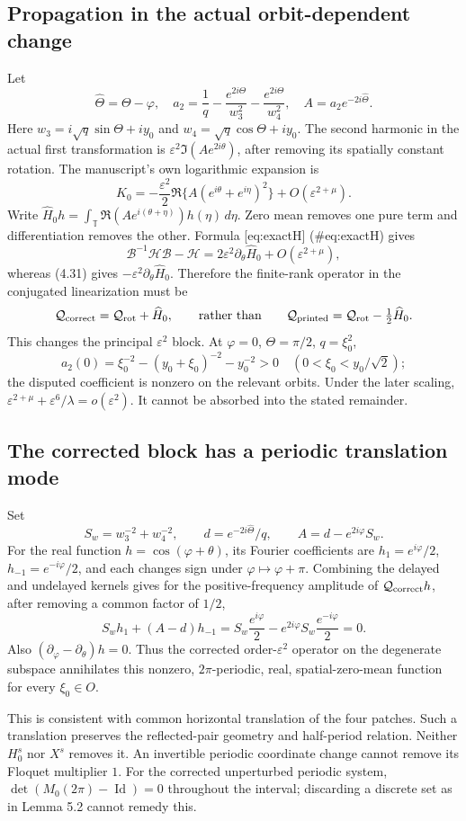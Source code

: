 \documentclass[10pt]{article}
\begin{document}
\subsection*{Propagation in the actual orbit-dependent change}
Let \[\widehat\Theta=\Theta-\varphi,\quad
 a_2=\frac1q-\frac{e^{2i\Theta}}{w_3^2}
                  -\frac{e^{2i\Theta}}{w_4^2},\quad
 A=a_2e^{-2i\widehat\Theta}.\] Here \(w_3=i\sqrt q\sin\Theta+iy_0\) and \(w_4=\sqrt q\cos\Theta+iy_0\). The second harmonic in the actual first transformation is \(\varepsilon^2\Im(Ae^{2i\theta})\), after removing its spatially constant rotation. The manuscript’s own logarithmic expansion is \[K_0=-\frac{\varepsilon^2}{2}
        \Re\{A(e^{i\theta}+e^{i\eta})^2\}
          +O(\varepsilon^{2+\mu}).\] Write \(\widehat H_0h=\int_\mathbb T\Re(Ae^{i(\theta+\eta)})h(\eta)\,d\eta\). Zero mean removes one pure term and differentiation removes the other. Formula [eq:exactH] (\#eq:exactH) gives \[\mathcal B^{-1}\mathcal H\mathcal B-\mathcal H
       =2\varepsilon^2\partial_\theta\widehat H_0
            +O(\varepsilon^{2+\mu}),\] whereas (4.31) gives \(-\varepsilon^2\partial_\theta\widehat H_0\). Therefore the finite-rank operator in the conjugated linearization must be \[\mathcal Q_{\rm correct}=\mathcal Q_{\rm rot}+\widehat H_0,
 \qquad\hbox{rather than}\qquad
 \mathcal Q_{\rm printed}=\mathcal Q_{\rm rot}-\tfrac12\widehat H_0.\] This changes the principal \(\varepsilon^2\) block. At \(\varphi=0\), \(\Theta=\pi/2\), \(q=\xi_0^2\), \[a_2(0)=\xi_0^{-2}-(y_0+\xi_0)^{-2}-y_0^{-2}>0
       \quad (0<\xi_0<y_0/\sqrt2);\] the disputed coefficient is nonzero on the relevant orbits. Under the later scaling, \(\varepsilon^{2+\mu}+\varepsilon^6/\lambda=o(\varepsilon^2)\). It cannot be absorbed into the stated remainder.\par
\subsection*{The corrected block has a periodic translation mode}
Set \[S_w=w_3^{-2}+w_4^{-2},\qquad
 d=e^{-2i\widehat\Theta}/q,\qquad
 A=d-e^{2i\varphi}S_w.\] For the real function \(h=\cos(\varphi+\theta)\), its Fourier coefficients are \(h_1=e^{i\varphi}/2\), \(h_{-1}=e^{-i\varphi}/2\), and each changes sign under \(\varphi\mapsto\varphi+\pi\). Combining the delayed and undelayed kernels gives for the positive-frequency amplitude of \(\mathcal Q_{\rm correct}h\), after removing a common factor of \(1/2\), \[S_w h_1+(A-d)h_{-1}
  =S_w\frac{e^{i\varphi}}2
      -e^{2i\varphi}S_w\frac{e^{-i\varphi}}2=0.\] Also \((\partial_\varphi-\partial_\theta)h=0\). Thus the corrected order-\(\varepsilon^2\) operator on the degenerate subspace annihilates this nonzero, \(2\pi\)-periodic, real, spatial-zero-mean function for every \(\xi_0\in O\).\par
This is consistent with common horizontal translation of the four patches. Such a translation preserves the reflected-pair geometry and half-period relation. Neither \(H_0^s\) nor \(X^s\) removes it. An invertible periodic coordinate change cannot remove its Floquet multiplier \(1\). For the corrected unperturbed periodic system, \(\det(M_0(2\pi)-\operatorname{Id})=0\) throughout the interval; discarding a discrete set as in Lemma 5.2 cannot remedy this.\par
\end{document}
